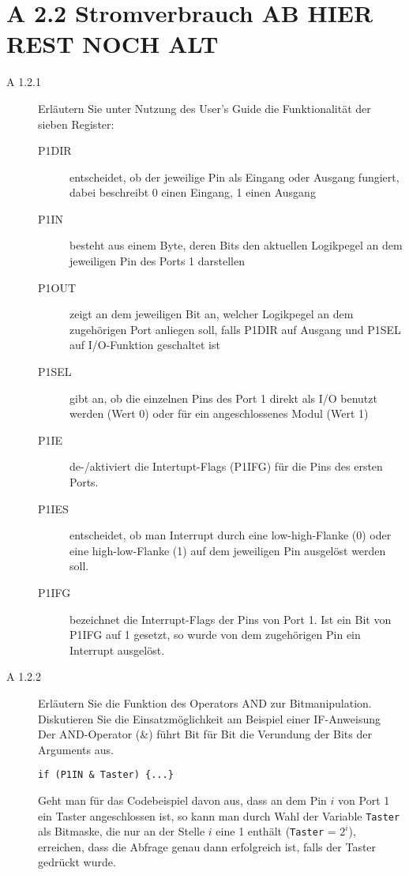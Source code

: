 \documentclass[11pt,a4paper,ngerman]{article}
\begin{document}
\newpage
\section*{A 2.2 Stromverbrauch AB HIER REST NOCH ALT}

\begin{description}
	\item[A 1.2.1] Erläutern Sie unter Nutzung des User's Guide die Funktionalität der sieben Register:
	
	\begin{description}
		\item[P1DIR] entscheidet, ob der jeweilige Pin als Eingang oder Ausgang fungiert, dabei beschreibt 0 einen Eingang, 1 einen Ausgang
		\item[P1IN] besteht aus einem Byte, deren Bits den aktuellen Logikpegel an dem jeweiligen Pin des Ports 1 darstellen
		\item[P1OUT] zeigt an dem jeweiligen Bit an, welcher Logikpegel an dem zugehörigen Port anliegen soll, falls P1DIR auf Ausgang und P1SEL auf I/O-Funktion geschaltet ist
		\item[P1SEL] gibt an, ob die einzelnen Pins des Port 1 direkt als I/O benutzt werden (Wert 0) oder für ein angeschlossenes Modul (Wert 1)
		\item[P1IE] de-/aktiviert die Intertupt-Flags (P1IFG) für die Pins des ersten Ports.
		\item[P1IES] entscheidet, ob man Interrupt durch eine low-high-Flanke (0) oder eine high-low-Flanke (1) auf dem jeweiligen Pin ausgelöst werden soll.
		\item[P1IFG] bezeichnet die Interrupt-Flags der Pins von Port 1. Ist ein Bit von P1IFG auf 1 gesetzt, so wurde von dem zugehörigen Pin ein Interrupt ausgelöst.
	\end{description}
	
	\item[A 1.2.2] Erläutern Sie die Funktion des Operators AND zur Bitmanipulation. Diskutieren Sie die Einsatzmöglichkeit am Beispiel einer IF-Anweisung \\
	
	Der AND-Operator (\&) führt Bit für Bit die Verundung der Bits der Arguments aus.\\
	\begin{lstlisting}
if (P1IN & Taster) {...}
	\end{lstlisting}
	Geht man für das Codebeispiel davon aus, dass an dem Pin $i$ von Port 1 ein Taster angeschlossen ist, so kann man durch Wahl der Variable \texttt{Taster} als Bitmaske, die nur an der Stelle $i$ eine 1 enthält (\texttt{Taster} = $2^i$), erreichen, dass die Abfrage genau dann erfolgreich ist, falls der Taster gedrückt wurde.
	

\end{description}
\end{document}
